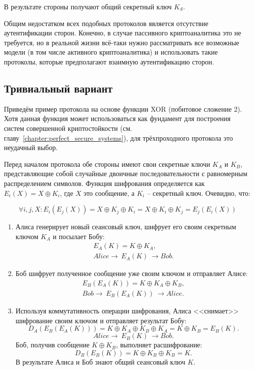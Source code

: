 В результате стороны получают общий секретный ключ $K_S$.

Общим недостатком всех подобных протоколов является отсутствие аутентификации сторон. Конечно, в случае пассивного криптоаналитика это не требуется, но в реальной жизни всё-таки нужно рассматривать все возможные модели (в том числе активного криптоаналитика) и использовать такие протоколы, которые предполагают взаимную аутентификацию сторон.

\subsection{Тривиальный вариант}

Приведём пример протокола на основе функции XOR (побитовое сложение 2). Хотя данная функция может использоваться как фундамент для построения систем совершенной криптостойкости (см. главу~\ref{chapter:perfect_secure_systems}), для трёхпроходного протокола это неудачный выбор.

Перед началом протокола обе стороны имеют свои секретные ключи $K_A$ и $K_B$, представляющие собой случайные двоичные последовательности с равномерным распределением символов. Функция шифрования определяется как $E_i( X ) = X \oplus K_i$, где $X$ это сообщение, а $K_i$ -- секретный ключ. Очевидно, что:

\[ \forall i, j, X: E_i \left( E_j \left( X \right) \right) = X \oplus K_j \oplus K_i = X \oplus K_i \oplus K_j = E_j \left( E_i \left( X \right) \right) \]

\begin{enumerate}
    \item Алиса генерирует новый сеансовый ключ, шифрует его своим секретным ключом $K_A$ и посылает Бобу:
            \[\begin{array}{l}
		E_A(K) = K \oplus K_A, \\
		Alice \rightarrow ~ E_A(K) ~ \rightarrow Bob.
	    \end{array}\]
    \item Боб шифрует полученное сообщение уже своим ключом и отправляет Алисе:
            \[\begin{array}{l}
		E_B(E_A(K)) = K \oplus K_A \oplus K_B, \\
		Bob \rightarrow ~ E_B(E_A(K)) ~ \rightarrow Alice.
	    \end{array}\]
    \item Используя коммутативность операции шифрования, Алиса <<снимает>> шифрование своим ключом и отправляет результат Бобу:
            \[ D_A \left( E_B \left( E_A \left( K \right) \right) \right) = K \oplus K_A \oplus K_B \oplus K_A = K \oplus K_B = E_B \left( K \right). \]
            \[ Alice \rightarrow ~ E_B \left( K \right) ~ \rightarrow Bob. \]
    Боб, получив сообщение $K \oplus K_B$, выполняет расшифрование:
            \[ D_B( E_B( K ) ) = K \oplus K_B \oplus K_B = K. \]
    В результате Алиса и Боб знают общий сеансовый ключ $K$.
\end{enumerate}

